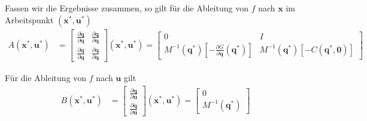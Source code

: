 \documentclass[a4paper, 12pt]{scrartcl}
\begin{document}
Fassen wir die Ergebnisse zusammen, so gilt für die Ableitung von $f$ nach $\bm{x}$ im Arbeitspunkt $(\bm{x}^*, \bm{u}^*)$
\begin{align*}
    A(\bm{x}^*, \bm{u}^*)
    &=
    \begin{bmatrix}
        \frac{\partial \bm{\dot{q}}}{\partial \bm{q}} 
        & \frac{\partial \bm{\dot{q}}}{\partial \bm{\dot{q}}} \\[6pt]
        \frac{\partial \ddot{\bm{q}}}{\partial \bm{q}} 
        & \frac{\partial \ddot{\bm{q}}}{\partial \bm{\dot{q}}}
    \end{bmatrix}
    (\bm{x}^*, \bm{u}^*) 
    =
    \begin{bmatrix}
        0 & I \\
        M^{-1}(\bm{q}^*) 
        \left[
            -\frac{\partial G}{\partial \bm{q}}(\bm{q}^*) 
        \right]
        & 
        M^{-1}(\bm{q}^*) 
        \left[
            -C(\bm{q}^*,\bm{0})
        \right]
    \end{bmatrix}   
\end{align*}

Für die Ableitung von $f$ nach $\bm{u}$ gilt
\begin{align*}
    B(\bm{x}^*, \bm{u}^*)
    &=
    \begin{bmatrix}
        \frac{\partial \bm{\dot{q}}}{\partial \bm{u}} \\[6pt]
        \frac{\partial \ddot{\bm{q}}}{\partial \bm{u}}
    \end{bmatrix}
    (\bm{x}^*, \bm{u}^*) 
    =
    \begin{bmatrix}
        0 \\[6pt]
        M^{-1}(\bm{q}^*)
    \end{bmatrix}
\end{align*}
\end{document}
